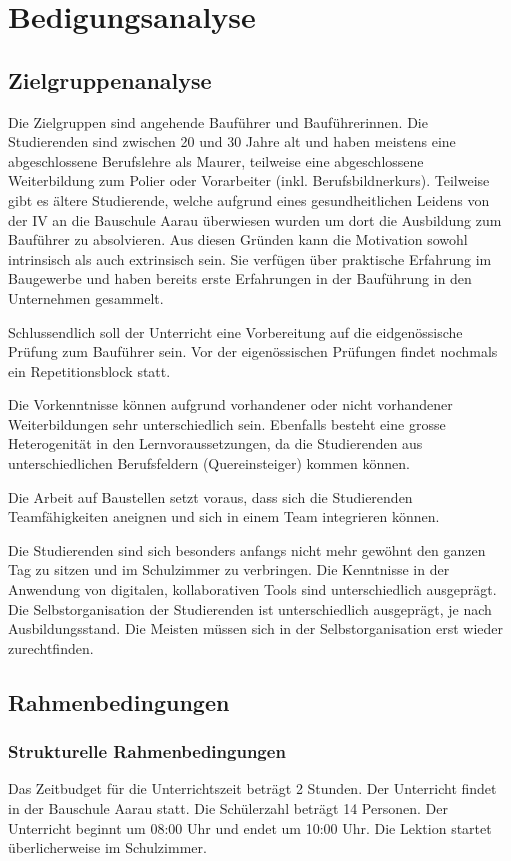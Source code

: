 \documentclass[
11pt,
captions=tableheading,
headsepline,
footsepline, 
captions=tableheading,
parskip=half-,
]{scrartcl}
\begin{document}
\clearpage

\section{Bedigungsanalyse}

\subsection{Zielgruppenanalyse}
Die Zielgruppen sind angehende Bauführer und Bauführerinnen. Die Studierenden sind zwischen 20 und 30 Jahre alt und haben meistens eine abgeschlossene Berufslehre als Maurer, teilweise eine abgeschlossene Weiterbildung zum Polier oder Vorarbeiter (inkl. Berufsbildnerkurs). 
Teilweise gibt es ältere Studierende, welche aufgrund eines gesundheitlichen Leidens von der IV an die Bauschule Aarau überwiesen wurden um dort die Ausbildung zum Bauführer zu absolvieren.
Aus diesen Gründen kann die Motivation sowohl intrinsisch als auch extrinsisch sein.
Sie verfügen über praktische Erfahrung im Baugewerbe und haben bereits erste Erfahrungen in der Bauführung in den Unternehmen gesammelt.

Schlussendlich soll der Unterricht eine Vorbereitung auf die eidgenössische Prüfung zum Bauführer sein. 
Vor der eigenössischen Prüfungen findet nochmals ein Repetitionsblock statt. 

Die Vorkenntnisse können aufgrund vorhandener oder nicht vorhandener Weiterbildungen sehr unterschiedlich sein. 
Ebenfalls besteht eine grosse Heterogenität in den Lernvoraussetzungen, da die Studierenden aus unterschiedlichen Berufsfeldern (Quereinsteiger) kommen können.

Die Arbeit auf Baustellen setzt voraus, dass sich die Studierenden Teamfähigkeiten aneignen und sich in einem Team integrieren können. 

Die Studierenden sind sich besonders anfangs nicht mehr gewöhnt den ganzen Tag zu sitzen und im Schulzimmer zu verbringen. 
Die Kenntnisse in der Anwendung von digitalen, kollaborativen Tools sind unterschiedlich ausgeprägt.
Die Selbstorganisation der Studierenden ist unterschiedlich ausgeprägt, je nach Ausbildungsstand. 
Die Meisten müssen sich in der Selbstorganisation erst wieder zurechtfinden.

\subsection{Rahmenbedingungen}
\subsubsection{Strukturelle Rahmenbedingungen}
Das Zeitbudget für die Unterrichtszeit beträgt 2 Stunden. Der Unterricht findet in der Bauschule Aarau statt. Die Schülerzahl beträgt 14 Personen. Der Unterricht beginnt um 08:00 Uhr und endet um 10:00 Uhr.
Die Lektion startet überlicherweise im Schulzimmer.
\end{document}

